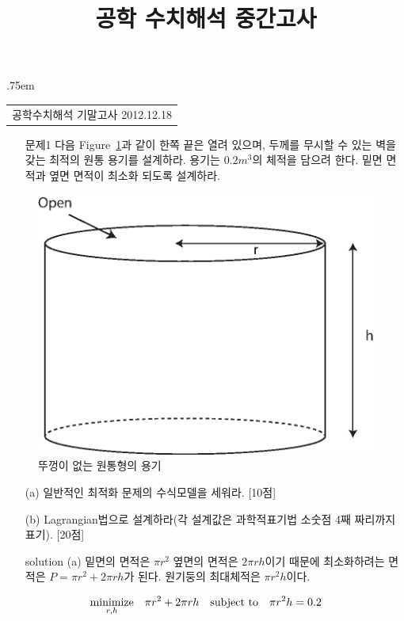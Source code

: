 \documentclass[a4,10pt]{article}
\title{공학 수치해석 중간고사}
\author{}
\makeatletter
\theoremstyle{examplestyle}
\let\\\tabularnewline
\let\\\tabularnewline
\renewcommand{\tableofcontents}[1][\contentsname]{%
  \section*{#1}
  \begin{multicols}{2}
    \@starttoc{toc}
  \end{multicols}
}
\makeatother
\begin{document}
\begin{center}
{\lineskip .75em\begin{tabular}[t]{c}\LARGE{공학수치해석 기말고사} \large{2012.12.18}\end{tabular}\par}%
\end{center}

\begin{itemize}
\item[문제1] 다음 Figure~\ref{fig:prob1}과 같이 한쪽 끝은 열려 있으며, 두께를 무시할 수 있는 벽을 갖는 최적의 원통 용기를 설계하라. 용기는 $0.2m^{3}$의 체적을 담으려 한다. 밑면 면적과 옆면 면적이 최소화 되도록 설계하라.
\end{itemize}
\begin{figure}[!hbpt]
\centering
\includegraphics[keepaspectratio=true,width=0.4\linewidth]{finalterm/prob1.eps}
\caption{뚜껑이 없는 원통형의 용기}
\label{fig:prob1}
\end{figure}
\begin{itemize}
\item[(a)] 일반적인 최적화 문제의 수식모델을 세워라. [10점]
\item[(b)] Lagrangian법으로 설계하라(각 설계값은 과학적표기법 소숫점 4째 짜리까지 표기). [20점]
\item[solution (a)] 밑면의 면적은 $\pi r^{2}$ 옆면의 면적은 $2\pi rh$이기 때문에 최소화하려는 면적은 $P=\pi r^{2}+2\pi rh$가 된다. 원기둥의 최대체적은 $\pi r^{2}h$이다.
\end{itemize}
\begin{equation*}
\begin{aligned}
& \underset{r,h}{\text{minimize}}& &\pi r^{2}+2\pi rh\\
& \text{subject to}& & \pi r^{2}h=0.2\\
\end{aligned}
\end{equation*}
\end{document}
